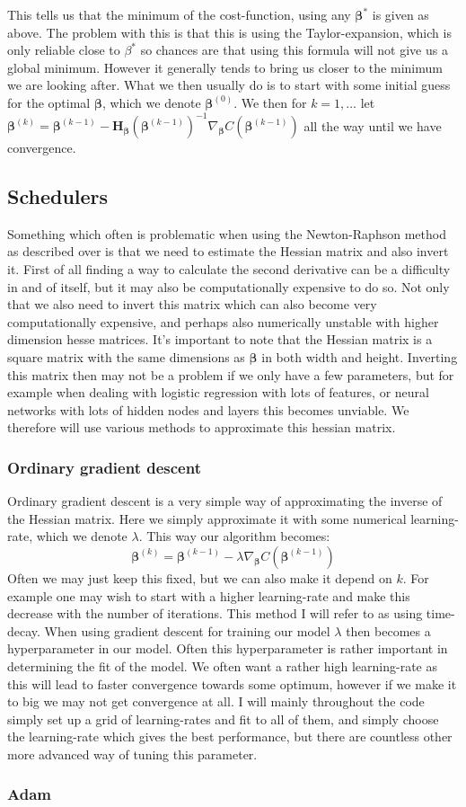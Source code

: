 \documentclass{article}
\begin{document}
This tells us that the minimum of the cost-function, using any $\bm{\beta}^*$ is
given as above. The problem with this is that this is using the
Taylor-expansion, which is only reliable close to $\beta^*$ so chances are that
using this formula will not give us a global minimum. However it generally tends
to bring us closer to the minimum we are looking after. What we then usually do
is to start with some initial guess for the optimal $\bm{\beta}$, which we
denote $\bm{\beta}^{(0)}$. We then for $k=1, \dots$ let $\bm{\beta}^(k) =
    \bm{\beta}^{(k-1)} - \bm{H}_{\bm{\beta}}(\bm{\beta}^{(k-1)})^{-1}
    \nabla_{\bm{\beta}} C(\bm{\beta}^{(k-1)})$ all the way until we have convergence.

\subsection{Schedulers}
Something which often is problematic when using the Newton-Raphson method as
described over is that we need to estimate the Hessian matrix and also invert
it. First of all finding a way to calculate the second derivative can be a
difficulty in and of itself, but it may also be computationally expensive to do
so. Not only that we also need to invert this matrix which can also become very
computationally expensive, and perhaps also numerically unstable with higher
dimension hesse matrices. It's important to note that the Hessian matrix is a
square matrix with the same dimensions as $\bm{\beta}$ in both width and height.
Inverting this matrix then may not be a problem if we only have a few
parameters, but for example when dealing with logistic regression with lots of
features, or neural networks with lots of hidden nodes and layers this becomes
unviable. We therefore will use various methods to approximate this hessian matrix.

\subsubsection{Ordinary gradient descent}
Ordinary gradient descent is a very simple way of approximating the inverse of
the Hessian matrix. Here we simply approximate it with some numerical
learning-rate, which we denote $\lambda$. This way our algorithm becomes:
$$\bm{\beta}^(k) = \bm{\beta}^{(k-1)} - \lambda \nabla_{\bm{\beta}} C(\bm{\beta}^{(k-1)})$$
Often we may just keep this fixed, but we can also make it depend on $k$. For
example one may wish to start with a higher learning-rate and make this decrease
with the number of iterations. This method I will refer to as using time-decay.
When using gradient descent for training our model $\lambda$ then becomes a
hyperparameter in our model. Often this hyperparameter is rather important in
determining the fit of the model. We often want a rather high learning-rate as
this will lead to faster convergence towards some optimum, however if we make it
to big we may not get convergence at all. I will mainly throughout the code
simply set up a grid of learning-rates and fit to all of them, and simply choose
the learning-rate which gives the best performance, but there are countless
other more advanced way of tuning this parameter.

\subsubsection{Adam}


\end{document}
